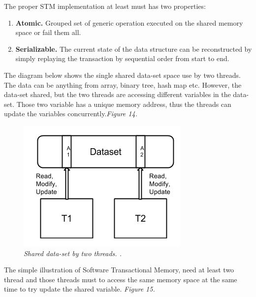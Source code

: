 \documentclass[12pt]{article}
\begin{document}
{\setlength{\parindent}{0cm}
The proper STM implementation at least must has two properties:}
\begin{enumerate}
\item \textbf{Atomic.} Grouped set of generic operation executed on the shared memory space or fail them all.   
\item \textbf{Serializable.} The current state of the data structure can be reconstructed by simply replaying the transaction by sequential order from start to end.\cite{Dennis}
\end{enumerate}

The diagram below shows the single shared data-set space use by two threads. The data can be anything from array, binary tree, hash map etc. However, the data-set shared, but the two threads are accessing different variables in the data-set. Those two variable has a unique memory address, thus the threads can update the variables concurrently.\textit{\color{gray}Figure 14.}\\

\begin{figure}[h!]
\centering
\includegraphics[scale=0.4]{Pictures/STM.png}
\caption{\textit{\color{gray}Shared data-set by two threads. \cite{Dennis}.}}
\end{figure}

The simple illustration of Software Transactional Memory, need at least two thread and those threads must to access the same memory space at the same time to try update the shared variable. \textit{\color{gray}Figure 15.}\\
\end{document}

